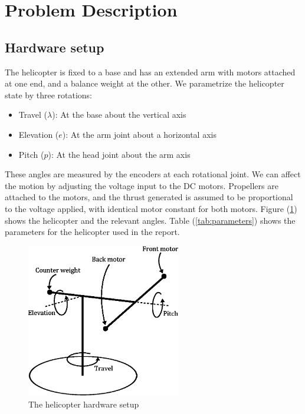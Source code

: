 \section{Problem Description}\label{sec:prob_descr}

\subsection{Hardware setup}
The helicopter is fixed to a base and has an extended arm with motors attached at one end,
and a balance weight at the other. We parametrize the helicopter state by three rotations:
\begin{itemize}
    \item Travel ($\lambda$): At the base about the vertical axis
    \item Elevation ($e$): At the arm joint about a horizontal axis
    \item Pitch ($p$): At the head joint about the arm axis
\end{itemize}
These angles are measured by the encoders at each rotational joint. We can affect the motion by adjusting the voltage input to the DC motors. Propellers are attached to the motors, and the thrust generated is assumed to be proportional to the voltage applied, with identical motor constant for both motors. Figure (\ref{fig:hardware}) shows the helicopter and the relevant angles. Table (\ref{tab:parameters}) shows the parameters for the helicopter used in the report.

\begin{figure}[htb]
	\centering
	\includegraphics[width = 0.6\textwidth]{figures/hardware_setup.eps}
	\caption{The helicopter hardware setup}
	\label{fig:hardware}
\end{figure}

